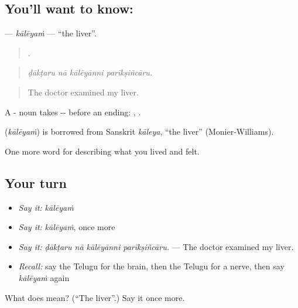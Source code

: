 \subsection*{You'll want to know: }
\textbf{} — \emph{kālēyaṁ} — \textquotedblleft{}the liver\textquotedblright{}.

\begin{quote}
   .
\end{quote}

\begin{quote}
\emph{ḍākṭaru nā kālēyānni parīkṣiñcāru.}
\end{quote}

\begin{quote}
The doctor examined my liver.
\end{quote}

A - noun takes -- before an ending: , .

\begin{cousinweb}
\textbf{} (\emph{kālēyaṁ}) is borrowed from Sanskrit \emph{kāleya}, \textquotedblleft{}the liver\textquotedblright{} (Monier-Williams).
\end{cousinweb}

\begin{grammarlens}[title={What you've built}]
One more word for describing what you lived and felt.
\end{grammarlens}

\subsection*{Your turn}
\begin{itemize}
\raggedright
  \item \emph{Say it:} \emph{kālēyaṁ}
  \item \emph{Say it:} \emph{kālēyaṁ}, once more
  \item \emph{Say it:} \emph{ḍākṭaru nā kālēyānni parīkṣiñcāru.} — The doctor examined my liver.
  \item \emph{Recall:} say the Telugu for the brain, then the Telugu for a nerve, then say \emph{kālēyaṁ} again
\end{itemize}

\begin{tcolorbox}[breakable,colback=teal!4,colframe=teal!35!black,title={Before you move on}]
What does  mean? (\textquotedblleft{}The liver\textquotedblright{}.) Say it once more.
\end{tcolorbox}
